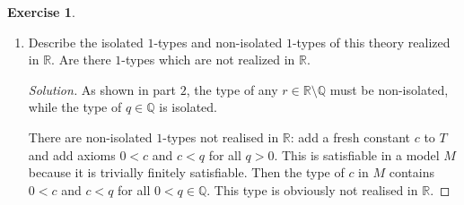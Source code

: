 \documentclass{article}
\renewcommand{\qedsymbol}{\raisebox{-0.5cm}{}}
\newcommand{\Q}{\mathbb{Q}}
\newcommand{\R}{\mathbb{R}}
\newenvironment{solution}{\begin{proof}[Solution]\renewcommand\qedsymbol{}}{\end{proof}}
\theoremstyle{definition}
\newtheorem{question}{Exercise}
\begin{document}
\begin{question}
\begin{enumerate}[(1)]
\begin{proof}
                  This means that \(\Q\) is a prime model.
              \end{proof}

        \item Describe the isolated \(1\)-types and non-isolated \(1\)-types of
              this theory realized in \(\R\). Are there \(1\)-types which are
              not realized in \(\R\).

              \begin{solution}
                  As shown in part \(2\), the type of any \(r\in\R\setminus\Q\)
                  must be non-isolated, while the type of \(q\in\Q\) is
                  isolated.

                  There are non-isolated \(1\)-types not realised in \(\R\): add a
                  fresh constant \(c\) to \(T\) and add axioms \(0<c\) and
                  \(c<q\) for all \(q>0\). This is satisfiable in a model \(M\)
                  because it is trivially finitely satisfiable. Then the type of
                  \(c\) in \(M\) contains \(0<c\) and \(c<q\) for all
                  \(0<q\in\Q\). This type is obviously not realised in \(\R\).
              \end{solution}
    \end{enumerate}
\end{question}
\end{document}
